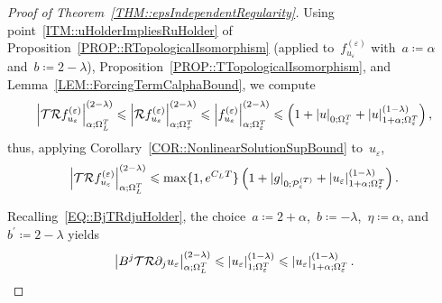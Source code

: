 \documentclass[12pt,a4paper]{amsart}
\makeatletter
\numberwithin{equation}{section}
\theoremstyle{definition}
\theoremstyle{remark}
\newcommand{\eps}{\varepsilon}
\newcommand{\abs}[1]{\left\lvert#1\right\rvert}
\renewcommand{\leq}{\leqslant}
\newcommand{\const}[1]{%
  \csname const@#1\endcsname%
}
\makeatother
\begin{document}
\begin{proof}[Proof of Theorem~\ref{THM::epsIndependentRegularity}]
    Using point~\ref{ITM::uHolderImpliesRuHolder} of Proposition~\ref{PROP::RTopologicalIsomorphism} (applied to~$f_{u_\eps}^{(\eps)}$ with~$a \coloneq \alpha$ and~$b \coloneq 2-\lambda$), Proposition~\ref{PROP::TTopologicalIsomorphism}, and Lemma~\ref{LEM::ForcingTermCalphaBound}, we compute
    \begin{equation}
        \abs{\mathcal{T}\mathcal{R}f_{u_\eps}^{(\eps)}}_{\alpha; \Omega_L^T}^{(2-\lambda)} \leq \const{CONST::TTopologicalIsomorphismUpper}\abs{\mathcal{R}f_{u_\eps}^{(\eps)}}_{\alpha; \Omega_\tau^T}^{(2-\lambda)} \leq \const{CONST::RuHolderEstimate}\const{CONST::TTopologicalIsomorphismUpper} \abs{f_{u_\eps}^{(\eps)}}_{\alpha; \Omega_\eps^T}^{(2-\lambda)} \leq \const{CONST::RuHolderEstimate}\const{CONST::TTopologicalIsomorphismUpper}\const{CONST::ForcingTermCalphaBound} \left(1 + \abs{u}_{0;\Omega_\eps^T} + \abs{u}_{1+\alpha; \Omega_\eps^T}^{(1-\lambda)}\right),
    \end{equation}
    thus, applying Corollary~\ref{COR::NonlinearSolutionSupBound} to~$u_\eps$,
    \begin{equation}\label{EQ::TRfuBound}
        \abs{\mathcal{T}\mathcal{R}f_{u_\eps}^{(\eps)}}_{\alpha; \Omega_L^T}^{(2-\lambda)} \leq \const{CONST::RuHolderEstimate}\const{CONST::TTopologicalIsomorphismUpper}\const{CONST::ForcingTermCalphaBound}\max\{1,e^{C_L T}\} \left(1 + \abs{g}_{0; \mathcal{P}_\eps^{(T)}} + \abs{u_\eps}_{1+\alpha; \Omega_\eps^T}^{(1-\lambda)}\right).
    \end{equation}

    Recalling~\eqref{EQ::BjTRdjuHolder}, the choice~$a \coloneq 2+\alpha$,~$b \coloneq -\lambda$,~$\eta \coloneq \alpha$, and~$b^\prime \coloneq 2-\lambda$ yields
    \begin{equation}\label{EQ::BjSRdjuBound}
        \abs{B^j\mathcal{T}\mathcal{R}\partial_j u_\eps}_{\alpha; \Omega_L^T}^{(2-\lambda)} \leq \const{CONST::BjTRdjuHolder} \abs{u_\eps}_{1; \Omega_\eps^T}^{(1-\lambda)} \leq \const{CONST::BjTRdjuHolder} \abs{u_\eps}_{1+\alpha; \Omega_\eps^T}^{(1-\lambda)}.
    \end{equation}


\end{proof}
\end{document}
